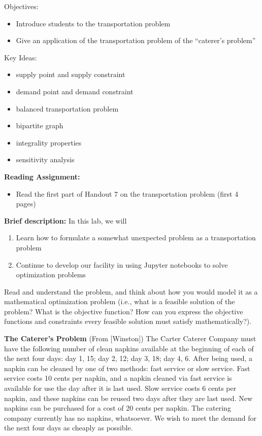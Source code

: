 \documentclass[twoside]{article}%
\begin{document}

\noindent

Objectives:

\begin{itemize}
\item   Introduce students to the transportation problem
\item   Give an application of the
transportation problem of the ``caterer's problem''
\end{itemize}

\noindent Key Ideas:
\begin{itemize}
\item   supply point and supply constraint
\item   demand point and demand constraint
\item   balanced transportation problem
\item   bipartite graph
\item   integrality properties
\item sensitivity analysis
\end{itemize}
\textbf{Reading Assignment:}
\begin{itemize}
\item
Read the first part of Handout 7 on the transportation problem (first 4 pages)\end{itemize}

\textbf{Brief description:}
In this lab, we will
\begin{enumerate}
\item Learn how to formulate a somewhat unexpected problem as a transportation problem
\item Continue to develop our facility in using Jupyter notebooks to solve optimization problems
\end{enumerate}

\smallskip
\noindent
Read and understand the problem, and think about how you would model it as a mathematical optimization problem (i.e., what is a feasible solution of the problem? What is the objective function? How can you express the objective functions and constraints every feasible solution must satisfy mathematically?). 


\smallskip
\noindent
\textbf{The Caterer's Problem} (From [Winston]) The Carter Caterer Company must have the following number of clean napkins available at the
beginning of each of the next four days: day 1, 15; day 2, 12; day
3, 18; day 4, 6. After being used, a napkin can be cleaned by one
of two methods: fast service or slow service. Fast service costs
10 cents per napkin, and a napkin cleaned via fast service is
available for use the day after it is last used. Slow service
costs 6 cents per napkin, and these napkins can be reused two days
after they are last used. New napkins can be purchased for a cost
of 20 cents per napkin. The catering company currently has no
napkins, whatsoever. We wish to meet the demand for the next four
days as cheaply as possible.
\end{document}
